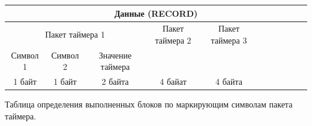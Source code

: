 \footnotesize
\begin{center}
	\begin{tabularx}{\textwidth}{|*5{c|}*6{X|}}
		\hline
		\multicolumn{11}{|c|}{Данные 
		(RECORD)}                                                       \\ 
		\hline
		\multicolumn{3}{|c|}{Пакет таймера 1}  & Пакет таймера 2 & Пакет 
		таймера 3 &  &  &  &  &  &  \\ \cline{1-3}
		Символ 1 & Символ 2 & Значение таймера &                 
		&                 &  &  &  &  &  &  \\ \hline
		 1 байт  &  1 байт  &     2 байта      &     4 байат     &     4 
		 байта     &  &  &  &  &  &  \\ \hline
	\end{tabularx}  
\end{center}
\normalsize
Таблица определения выполненных блоков по маркирующим символам пакета таймера.
\small
